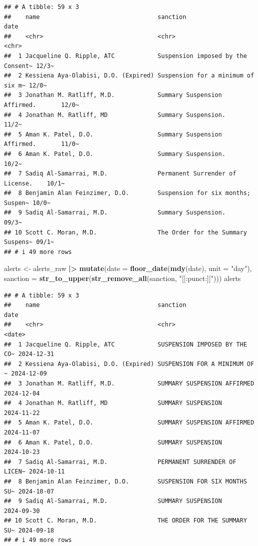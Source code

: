 \documentclass[
]{article}
\newenvironment{Shaded}{\begin{snugshade}}{\end{snugshade}}
\newcommand{\AttributeTok}[1]{\textcolor[rgb]{0.13,0.29,0.53}{#1}}
\newcommand{\FunctionTok}[1]{\textcolor[rgb]{0.13,0.29,0.53}{\textbf{#1}}}
\newcommand{\NormalTok}[1]{#1}
\newcommand{\OtherTok}[1]{\textcolor[rgb]{0.56,0.35,0.01}{#1}}
\newcommand{\SpecialCharTok}[1]{\textcolor[rgb]{0.81,0.36,0.00}{\textbf{#1}}}
\newcommand{\StringTok}[1]{\textcolor[rgb]{0.31,0.60,0.02}{#1}}
\begin{document}
\begin{verbatim}
## # A tibble: 59 x 3
##    name                                 sanction                           date 
##    <chr>                                <chr>                              <chr>
##  1 Jacqueline Q. Ripple, ATC            Suspension imposed by the Consent~ 12/3~
##  2 Kessiena Aya-Olabisi, D.O. (Expired) Suspension for a minimum of six m~ 12/0~
##  3 Jonathan M. Ratliff, M.D.            Summary Suspension Affirmed.       12/0~
##  4 Jonathan M. Ratliff, MD              Summary Suspension.                11/2~
##  5 Aman K. Patel, D.O.                  Summary Suspension Affirmed.       11/0~
##  6 Aman K. Patel, D.O.                  Summary Suspension.                10/2~
##  7 Sadiq Al-Samarrai, M.D.              Permanent Surrender of License.    10/1~
##  8 Benjamin Alan Feinzimer, D.O.        Suspension for six months; Suspen~ 10/0~
##  9 Sadiq Al-Samarrai, M.D.              Summary Suspension.                09/3~
## 10 Scott C. Moran, M.D.                 The Order for the Summary Suspens~ 09/1~
## # i 49 more rows
\end{verbatim}

\begin{Shaded}
\begin{Highlighting}[]
\NormalTok{alerts }\OtherTok{\textless{}{-}}\NormalTok{ alerts\_raw }\SpecialCharTok{|\textgreater{}}
  \FunctionTok{mutate}\NormalTok{(}\AttributeTok{date =} \FunctionTok{floor\_date}\NormalTok{(}\FunctionTok{mdy}\NormalTok{(date), }\AttributeTok{unit =} \StringTok{"day"}\NormalTok{),}
         \AttributeTok{sanction =} \FunctionTok{str\_to\_upper}\NormalTok{(}\FunctionTok{str\_remove\_all}\NormalTok{(sanction, }\StringTok{"[[:punct:]]"}\NormalTok{)))}
\NormalTok{alerts}
\end{Highlighting}
\end{Shaded}

\begin{verbatim}
## # A tibble: 59 x 3
##    name                                 sanction                      date      
##    <chr>                                <chr>                         <date>    
##  1 Jacqueline Q. Ripple, ATC            SUSPENSION IMPOSED BY THE CO~ 2024-12-31
##  2 Kessiena Aya-Olabisi, D.O. (Expired) SUSPENSION FOR A MINIMUM OF ~ 2024-12-09
##  3 Jonathan M. Ratliff, M.D.            SUMMARY SUSPENSION AFFIRMED   2024-12-04
##  4 Jonathan M. Ratliff, MD              SUMMARY SUSPENSION            2024-11-22
##  5 Aman K. Patel, D.O.                  SUMMARY SUSPENSION AFFIRMED   2024-11-07
##  6 Aman K. Patel, D.O.                  SUMMARY SUSPENSION            2024-10-23
##  7 Sadiq Al-Samarrai, M.D.              PERMANENT SURRENDER OF LICEN~ 2024-10-11
##  8 Benjamin Alan Feinzimer, D.O.        SUSPENSION FOR SIX MONTHS SU~ 2024-10-07
##  9 Sadiq Al-Samarrai, M.D.              SUMMARY SUSPENSION            2024-09-30
## 10 Scott C. Moran, M.D.                 THE ORDER FOR THE SUMMARY SU~ 2024-09-18
## # i 49 more rows
\end{verbatim}
\end{document}
